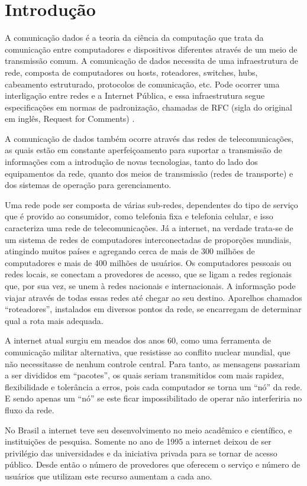 \section{Introdução}
	A comunicação dados é a teoria da ciência da computação que trata da comunicação entre computadores e dispositivos diferentes através de um meio de transmissão comum.  A comunicação de dados necessita de uma infraestrutura de rede, composta de computadores ou hosts, roteadores, switches, hubs, cabeamento estruturado, protocolos de comunicação, etc. Pode ocorrer uma interligação entre redes e a Internet Pública,  e essa infraestrutura segue especificações em normas de padronização, chamadas de RFC (sigla do original em inglês, Request for Comments) \cite{napsol2010}.
	
	A comunicação de dados também ocorre através das redes de telecomunicações, as quais estão em constante aperfeiçoamento para suportar a transmissão de informações com a introdução de novas tecnologias, tanto do lado dos equipamentos da rede, quanto dos meios de transmissão (redes de transporte) e dos sistemas de operação para gerenciamento. 
	
	Uma rede pode ser composta de várias sub-redes, dependentes do tipo de serviço que é provido ao consumidor, como telefonia fixa e  telefonia celular, e isso caracteriza uma rede de telecomunicações. Já a internet, na verdade  trata-se de um sistema de redes de computadores interconectadas de proporções mundiais, atingindo muitos países e agregando cerca de mais de 300 milhões de computadores e mais de 400 milhões de usuários. Os computadores pessoais ou redes locais, se conectam a provedores de acesso, que se ligam a redes regionais que, por sua vez, se unem à redes nacionais e internacionais. A informação pode viajar através de todas essas redes até chegar ao seu destino. Aparelhos chamados “roteadores”, instalados em diversos pontos da rede, se encarregam de determinar qual a rota mais adequada.
	
	A internet atual surgiu em meados dos anos 60, como uma ferramenta de comunicação militar alternativa, que resistisse ao conflito nuclear mundial, que não necessitasse de nenhum controle central. Para tanto, as mensagens passariam a ser divididos em “pacotes”, os quais seriam transmitidos com mais rapidez, flexibilidade e tolerância a erros, pois cada computador se torna um “nó” da rede. E sendo apenas um “nó” se este ficar impossibilitado de operar não interferiria no fluxo da rede.
	
	No Brasil a internet teve seu desenvolvimento no meio acadêmico e científico, e instituições de pesquisa. Somente no ano de 1995 a internet deixou de ser privilégio das universidades e da iniciativa privada para se tornar de acesso público. Desde então o número de provedores que oferecem o serviço e número de usuários que utilizam este recurso aumentam a cada ano.
	
